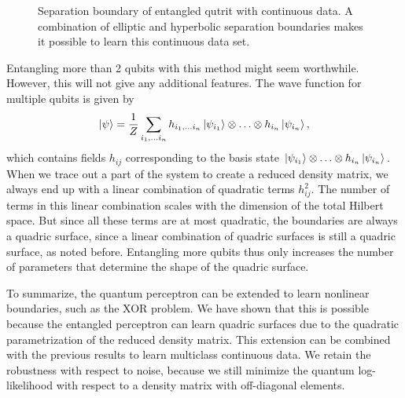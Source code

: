 \begin{figure}[htb!]
    \centering
    \caption{Separation boundary of entangled qutrit with continuous data. A combination of elliptic and hyperbolic separation boundaries makes it possible to learn this continuous data set.}
    \label{fig:entangled_qutrit_cont}
\end{figure}

\noindent Entangling more than 2 qubits with this method might seem worthwhile. However, this will not give any additional features. The wave function for multiple qubits is given by
\begin{equation*}
    \ket{\psi} = \frac{1}{Z}\sum_{i_1,\ldots i_n}  h_{i_1,\ldots i_n}\ket{\psi_{i_1}}\otimes \ldots \otimes h_{i_n}\ket{\psi_{i_n}},
\end{equation*}
which contains fields $h_{ij}$ corresponding to the basis state $\ket{\psi_{i_1}}\otimes \ldots \otimes h_{i_n}\ket{\psi_{i_n}}$. When we trace out a part of the system to create a reduced density matrix, we always end up with a linear combination of quadratic terms $h_{ij}^2$. The number of terms in this linear combination scales with the dimension of the total Hilbert space. But since all these terms are at most quadratic, the boundaries are always a quadric surface, since a linear combination of quadric surfaces is still a quadric surface, as noted before. Entangling more qubits thus only increases the number of parameters that determine the shape of the quadric surface.\newline

\noindent To summarize, the quantum perceptron can be extended to learn nonlinear boundaries, such as the XOR problem. We have shown that this is possible because the entangled perceptron can learn quadric surfaces due to the quadratic parametrization of the reduced density matrix. This extension can be combined with the previous results to learn multiclass continuous data. We retain the robustness with respect to noise, because we still minimize the quantum log-likelihood with respect to a density matrix with off-diagonal elements.


